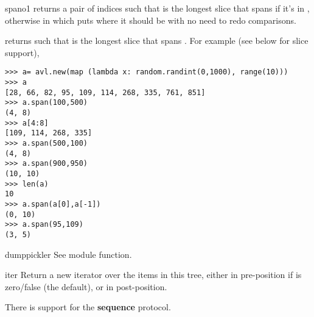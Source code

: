 \documentclass{howto}
\begin{document}
\begin{methoddesc}{span}{o1}
	 returns a pair of indices  such that 
	 is the longest slice that spans  if it's in ,
	otherwise  in which  puts  
	where it should be with no need to redo comparisons.
	
	 returns  such that 
	 is the longest slice that spans .
	For example (see below for slice support),
\begin{Verbatim}
>>> a= avl.new(map (lambda x: random.randint(0,1000), range(10)))
>>> a
[28, 66, 82, 95, 109, 114, 268, 335, 761, 851]
>>> a.span(100,500)
(4, 8)
>>> a[4:8]
[109, 114, 268, 335]
>>> a.span(500,100)
(4, 8)
>>> a.span(900,950)
(10, 10)
>>> len(a)
10
>>> a.span(a[0],a[-1])
(0, 10)
>>> a.span(95,109)
(3, 5)
\end{Verbatim}
\end{methoddesc}

\begin{methoddesc}{dump}{pickler}
	See  module function.
\end{methoddesc}

\begin{methoddesc}{iter}{}
	Return a new iterator over the items in this tree, either in
	pre-position if  is zero/false (the default), or in
	post-position.
\end{methoddesc}

There is support for the \textbf{sequence} protocol.
\end{document}
